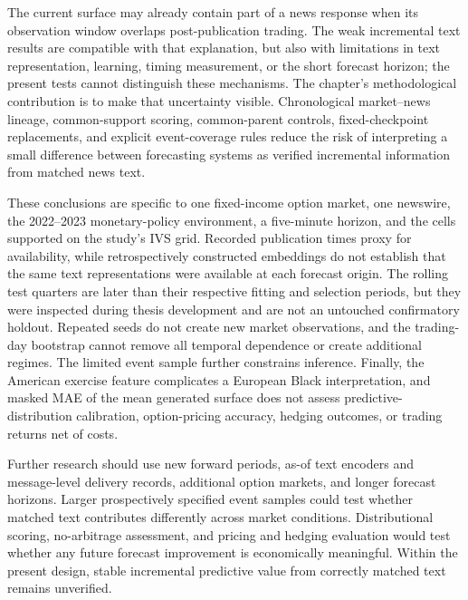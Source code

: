 The current surface may already contain part of a news response when its
observation window overlaps post-publication trading. The weak incremental
text results are compatible with that explanation, but also with limitations
in text representation, learning, timing measurement, or the short forecast
horizon; the present tests cannot distinguish these mechanisms. The chapter's
methodological contribution is to make that uncertainty visible. Chronological
market--news lineage, common-support scoring, common-parent controls,
fixed-checkpoint replacements, and explicit event-coverage rules reduce the
risk of interpreting a small difference between forecasting systems as
verified incremental information from matched news text.

These conclusions are specific to one fixed-income option market, one
newswire, the 2022--2023 monetary-policy environment, a five-minute horizon,
and the cells supported on the study's IVS grid. Recorded publication times
proxy for availability, while retrospectively constructed embeddings do not
establish that the same text representations were available at each forecast
origin. The rolling test quarters are later than their respective fitting and
selection periods, but they were inspected during thesis development and are
not an untouched confirmatory holdout. Repeated seeds do not create new
market observations, and the trading-day bootstrap cannot remove all temporal
dependence or create additional regimes. The limited event sample further
constrains inference. Finally, the American exercise feature complicates a
European Black interpretation, and masked MAE of the mean generated surface
does not assess predictive-distribution calibration, option-pricing accuracy,
hedging outcomes, or trading returns net of costs.

Further research should use new forward periods, as-of text encoders and
message-level delivery records, additional option markets, and longer
forecast horizons. Larger prospectively specified event samples could test
whether matched text contributes differently across market conditions.
Distributional scoring, no-arbitrage assessment, and pricing and hedging
evaluation would test whether any future forecast improvement is
economically meaningful. Within the present design, stable incremental
predictive value from correctly matched text remains unverified.
